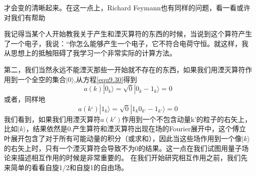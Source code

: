 才会变的清晰起来。在这一点上，Richard Feymann也有同样的问题，看一看或许对我们有帮助\\
\begin{center}
\parbox{0.9\textwidth}{\small 我记得当某个人开始教我关于产生和湮灭算符的东西的时候，当说到这个算符产生了一个电子，我说：“你怎么能够产生一个电子，它不符合电荷守恒。就这样，我从思想上的抵触阻碍了我学习一个非常实际的计算方法。}
\end{center}\vspace{4mm}
第二，我们当然永远不能湮灭那些一开始就不存在的东西，如果我们用湮灭算符作用到一个全空的集合$|0\rangle$,从方程\ref{equ9.30}得到
\begin{equation}
\label{equ9.31}
a(k)|0_{k} \rangle=\sqrt{0}|0_{k}-1_{k} \rangle=0
\end{equation}
或者，同样地
\begin{equation}
\label{equ9.32}
a(k‘)|1_{k} \rangle=\sqrt{0}|1_{k}0_{k'}-1_{k'} \rangle=0
\end{equation}
我们看到，如果我们用湮灭算符$a(k')$作用到一个不包含动量k'的粒子的右矢上，比如$|k\rangle$，结果依然是0.产生算符和湮灭算符出现在场的Fourier展开中，这个傅立叶展开包含了对于所有可能动量的积分（或求和），因此当这些场作用到一个像$|k\rangle$的右矢上时，只有一个湮灭算符会导致不为0的结果。这一点在我们试图用量子场论来描述相互作用的时候是非常重要的。
在我们开始研究相互作用之前，我们先来简单的看看自旋1/2和自旋1的自由场。




